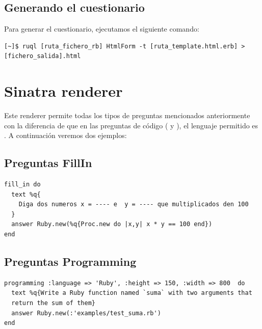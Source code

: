 \subsection{Generando el cuestionario}
\label{subsec:Apendice2.10}

Para generar el cuestionario, ejecutamos el siguiente comando:
\begin{verbatim}
[~]$ ruql [ruta_fichero_rb] HtmlForm -t [ruta_template.html.erb] > [fichero_salida].html
\end{verbatim}

\section{Sinatra renderer}
\label{Apendice2:sinatra}

Este renderer permite todas los tipos de preguntas mencionados anteriormente con la diferencia de que en las preguntas de c\'odigo ( y ), 
el lenguaje permitido es . A continuaci\'on veremos dos ejemplos:

\subsection{Preguntas FillIn}
\label{subsec:Apendice2.11}

\begin{lstlisting}
fill_in do
  text %q{
    Diga dos numeros x = ---- e  y = ---- que multiplicados den 100
  }
  answer Ruby.new(%q{Proc.new do |x,y| x * y == 100 end})
end
\end{lstlisting}

\subsection{Preguntas Programming}
\label{subsec:Apendice2.11}

\begin{lstlisting}
programming :language => 'Ruby', :height => 150, :width => 800  do
  text %q{Write a Ruby function named `suma` with two arguments that 
  return the sum of them}
  answer Ruby.new(:'examples/test_suma.rb')
end
\end{lstlisting}

